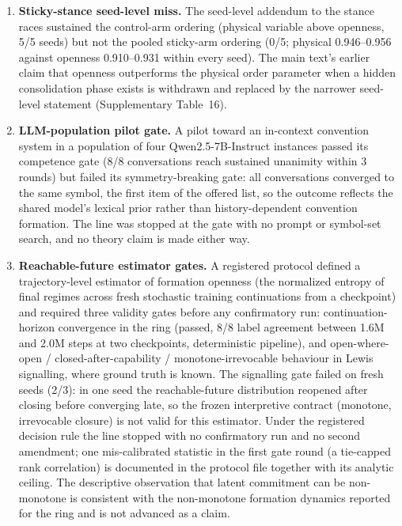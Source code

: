 \documentclass[11pt]{article}
\begin{document}
\begin{enumerate}
registered 0.80-at-every-time AUC bar (fixed-time AUCs 0.73--0.93
against 0.98--0.99 declared); the discovery recipe recovered the
two-regime structure in 5/5 seeds and the result is reported as a
registered miss (Supplementary Table~14).
\item \textbf{Sticky-stance seed-level miss.} The seed-level addendum
to the stance races sustained the control-arm ordering (physical
variable above openness, 5/5 seeds) but not the pooled sticky-arm
ordering (0/5; physical 0.946--0.956 against openness 0.910--0.931
within every seed). The main text's earlier claim that openness
outperforms the physical order parameter when a hidden consolidation
phase exists is withdrawn and replaced by the narrower seed-level
statement (Supplementary Table~16).
\item \textbf{LLM-population pilot gate.} A pilot toward an
in-context convention system in a population of four
Qwen2.5-7B-Instruct instances passed its competence gate (8/8
conversations reach sustained unanimity within 3 rounds) but failed
its symmetry-breaking gate: all conversations converged to the same
symbol, the first item of the offered list, so the outcome reflects
the shared model's lexical prior rather than history-dependent
convention formation. The line was stopped at the gate with no
prompt or symbol-set search, and no theory claim is made either way.
\item \textbf{Reachable-future estimator gates.} A registered
protocol defined a trajectory-level estimator of formation openness
(the normalized entropy of final regimes across fresh stochastic
training continuations from a checkpoint) and required three
validity gates before any confirmatory run: continuation-horizon
convergence in the ring (passed, 8/8 label agreement between 1.6M
and 2.0M steps at two checkpoints, deterministic pipeline), and
open-where-open / closed-after-capability / monotone-irrevocable
behaviour in Lewis signalling, where ground truth is known. The
signalling gate failed on fresh seeds (2/3): in one seed the
reachable-future distribution reopened after closing before
converging late, so the frozen interpretive contract (monotone,
irrevocable closure) is not valid for this estimator. Under the
registered decision rule the line stopped with no confirmatory run
and no second amendment; one mis-calibrated statistic in the first
gate round (a tie-capped rank correlation) is documented in the
protocol file together with its analytic ceiling. The descriptive
observation that latent commitment can be non-monotone is consistent
with the non-monotone formation dynamics reported for the ring and
is not advanced as a claim.
\end{enumerate}

\clearpage

\end{document}
